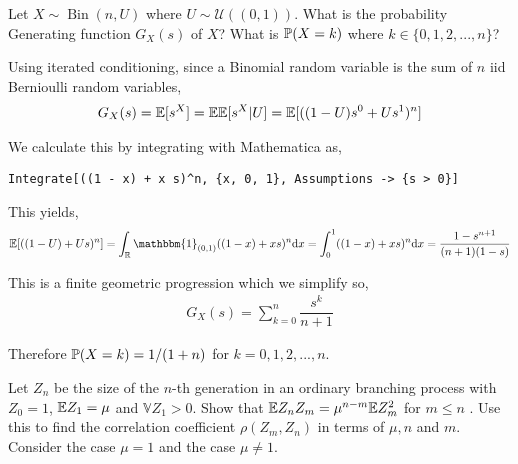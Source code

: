 \begin{problem}[Exercise 3.1]%
    Let \(X \sim \operatorname{Bin}(n,U) \) where \( U\sim \mathcal{U}((0,1))\). What is the probability Generating function \( G_X(s) \) of \( X \)? What is \( \mathbb{P}(X=k) \) where \( k\in\{0,1,2,...,n\} \)?
\end{problem}

\begin{solution}[Solution]
Using iterated conditioning, since a Binomial random variable is the sum of \( n \) iid Bernioulli random variables,
\begin{align*}
    G_X(s) = \mathbb{E}[s^X] = \mathbb{E}\mathbb{E}[s^X|U] = \mathbb{E}[((1-U)s^0+Us^1)^n]
\end{align*}

We calculate this by integrating with Mathematica as,
\begin{lstlisting}
Integrate[((1 - x) + x s)^n, {x, 0, 1}, Assumptions -> {s > 0}] 
\end{lstlisting}

This yields,
\begin{align*}
    \EE[((1-U)+Us)^n] = \int_\RR \mathbbm{1}_{(0,1)}((1-x)+xs)^n \d x 
    = \int_{0}^{1}((1-x)+xs)^n \d x = \dfrac{1-s^{n+1}}{(n+1)(1-s)} \\
\end{align*}

This is a finite geometric progression which we simplify so,
\begin{align*}
    G_X(s) = \sum_{k=0}^{n} \dfrac{s^k}{n+1}
\end{align*}

Therefore \( \mathbb{P}(X=k) = 1/(1+n) \) for \( k=0,1,2,...,n \).
\end{solution}

\begin{problem}[Exercise 3.2]
    Let \( Z_n \) be the size of the \( n \)-th generation in an ordinary branching process with \( Z_0 = 1\), \( \mathbb{E} Z_1=\mu \) and \( \mathbb{V}Z_1>0 \). Show that \( \mathbb{E} Z_nZ_m=\mu^{n-m} \mathbb{E} Z_m^2 \) for \( m\leq n\) . Use this to find the correlation coefficient \( \rho(Z_m,Z_n) \) in terms of \( \mu, n\) and \( m \). Consider the case \( \mu = 1 \) and the case \( \mu \neq 1 \).
\end{problem}

